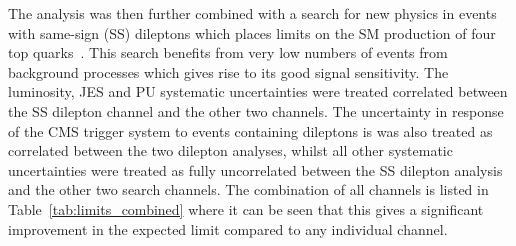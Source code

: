 The analysis was then further combined with a search for new physics in events with same-sign (SS) dileptons which places limits on the SM production of four top quarks~\cite{Khachatryan:2016kod}. This search benefits from very low numbers of events from background processes which gives rise to its good signal sensitivity. The luminosity, JES and PU systematic uncertainties were treated correlated between the SS dilepton channel and the other two channels. The uncertainty in response of the CMS trigger system to events containing dileptons is was also treated as correlated between the two dilepton analyses, whilst all other systematic uncertainties were treated as fully uncorrelated between the SS dilepton analysis and the other two search channels. The combination of all channels is listed in Table~\ref{tab:limits_combined} where it can be seen that this gives a significant improvement in the expected limit compared to any individual channel.

\clearpage

